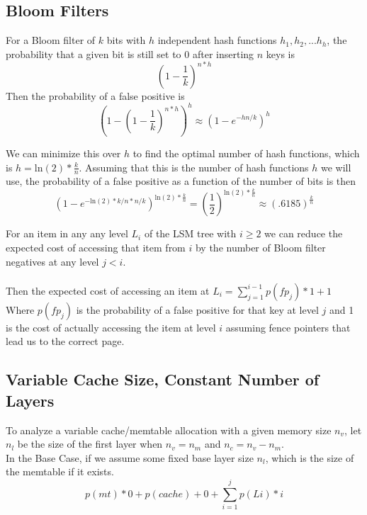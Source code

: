 \documentclass[11pt]{article}
\theoremstyle{plain}
\theoremstyle{definition}
\begin{document}
\subsection{Bloom Filters}

For a Bloom filter of $k$ bits with $h$ independent hash functions $h_1, h_2,...h_h$, the probability that a given bit is still set to 0 after inserting $n$ keys is 
$$
(1 - \frac{1}{k})^{n*h}
$$
Then the probability of a false positive is 
$$
(1- (1 - \frac{1}{k})^{n*h})^h \approx (1 - e^{-hn/k})^h
$$

We can minimize this over $h$ to find the optimal number of hash functions, which is $h = \mathrm{ln}(2) * \frac{k}{n}$. Assuming that this is the number of hash functions $h$ we will use, the probability of a false positive as a function of the number of bits is then 
$$
(1 - e^{-\mathrm{ln}(2)*k/n*n/k})^{\mathrm{ln}(2) * \frac{k}{n}} = (\frac{1}{2}) ^ {\mathrm{ln}(2) * \frac{k}{n}} \approx (.6185) ^  {\frac{k}{n}}
$$

For an item in any any level $L_i$ of the LSM tree with $i \geq 2$ we can reduce the expected cost of accessing that item from $i$ by the number of Bloom filter negatives at any level $j<i$. \\ \\
Then the expected cost of accessing an item at $L_i =  \sum_{j=1}^{i-1} p(fp_j) * 1 + 1$
Where $p(fp_j)$ is the probability of a false positive for that key at level $j$ and 1 is the cost of actually accessing the item at level $i$ assuming fence pointers that lead us to the correct page.

\subsection{Variable Cache Size, Constant Number of Layers}
To analyze a variable cache/memtable allocation with a given memory size $n_v$, let $n_l$ be the size of the first layer when $n_v = n_m$ and $n_c =n_v - n_m$.\\
In the Base Case, if we assume some fixed base layer size $n_l$, which is the size of the memtable if it exists.
$$
p(mt) * 0  + p(cache) + 0 + \sum_{i=1}^j p(Li) * i 
$$
\end{document}
